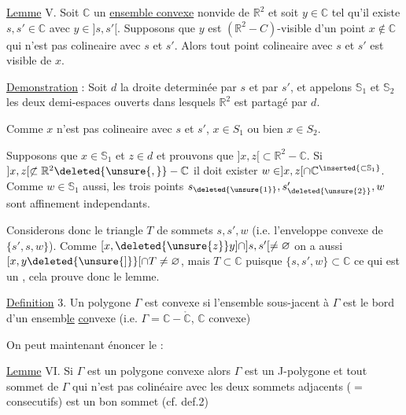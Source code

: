 \deleted{$]z,x]\subset\mathbb{R}^{2}-\mathbb{C}$, c.q.f.d.}

\uline{Lemme} V. Soit $\mathbb{C}$ un \uline{ensemble convexe} nonvide de $\mathbb{R}^{2}$ et soit $y\in\mathbb{C}$ tel qu'il existe $s,s'\in\mathbb{C}$ avec $y\in ]s,s'[$. Supposons que $y$ est $(\mathbb{R}^{2}-C)$-visible d'un point $x\notin\mathbb{C}$ qui n'est pas colineaire avec $s$ et $s'$. Alors tout point colineaire avec $s$ et $s'$ est visible de $x$.


\uline{Demonstration} : Soit $d$ la droite determinée par $s$ et par $s'$, et appelons $\mathbb{S}_{1}$ et $\mathbb{S}_{2}$ les deux demi-espaces ouverts dans lesquels $\mathbb{R}^{2}$ est partagé par $d$.

Comme $x$ n'est pas colineaire avec $s$ et $s'$,  $x\in S_{1}$ ou bien $x\in S_{2}$.

Supposons que $x\in\mathbb{S}_{1}$ et $z\in d$ et prouvons que $]x,z[\subset\mathbb{R}^{2}-\mathbb{C}$. Si $]x,z[\not\subset\mathbb{R}^{2}\deleted{\unsure{,}}-\mathbb{C}$ il doit exister $w\in ]x,z[\cap\mathbb{C}{}^{\inserted{\subset\mathbb{S}_{1}}}$. Comme $w\in\mathbb{S}_{1}$ aussi, les trois points $s_{\deleted{\unsure{1}}},s_{\deleted{\unsure{2}}}',w$ sont affinement independants.

Considerons donc le triangle $T$ de sommets $s,s',w$ (i.e. l'enveloppe convexe de $\{s',s,w\}$). Comme $[x,\deleted{\unsure{z}}y]\cap ]s,s'[\ne\varnothing$ on a aussi $[x,y\deleted{\unsure{]}}[\cap T\ne\varnothing$, mais $T\subset\mathbb{C}$ puisque $\{s,s',w\}\subset\mathbb{C}$ ce qui est un  \inserted{puisque on suppose $[x,y[\cap\mathbb{C}=\varnothing$}, cela prouve donc le lemme.

\uline{Definition} 3. Un polygone $\Gamma$ est  convexe  si l'ensemble sous-jacent à $\Gamma$ est le bord d'un ensemb\uline{le} \uline{co}nvexe (i.e. $\Gamma=\mathbb{C}-\mathring{\mathbb{C}}$, $\mathbb{C}$ convexe)

On peut maintenant énoncer le :

\uline{Lemme} VI. Si $\Gamma$ est un polygone convexe alors $\Gamma$ est un J-polygone et tout sommet de $\Gamma$  qui n'est pas colinéaire avec les deux sommets adjacents ($=$ consecutifs) est un bon sommet (cf. def.2)
